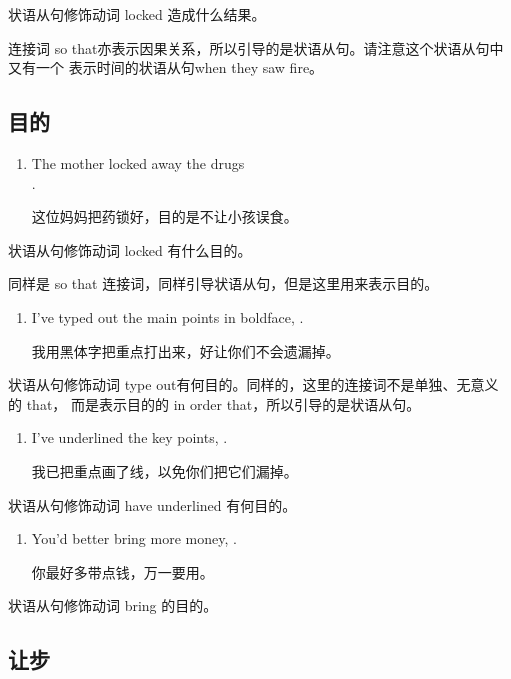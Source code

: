 状语从句修饰动词 locked 造成什么结果。

连接词 so that亦表示因果关系，所以引导的是状语从句。请注意这个状语从句中又有一个
表示时间的状语从句when they saw fire。

\subsection{目的}

\begin{enumerate}
\item The mother locked away the drugs  \\
  .

  这位妈妈把药锁好，目的是不让小孩误食。
\end{enumerate}
状语从句修饰动词 locked 有什么目的。

同样是 so that 连接词，同样引导状语从句，但是这里用来表示目的。

\begin{enumerate}[resume]
\item I've typed out the main points in boldface, 
  .

  我用黑体字把重点打出来，好让你们不会遗漏掉。
\end{enumerate}
状语从句修饰动词 type out有何目的。同样的，这里的连接词不是单独、无意义的 that，
而是表示目的的 in order that，所以引导的是状语从句。

\begin{enumerate}[resume]
\item I've underlined the key points,  .

  我已把重点画了线，以免你们把它们漏掉。
\end{enumerate}
状语从句修饰动词 have underlined 有何目的。

\begin{enumerate}[resume]
\item You'd better bring more money,  .

  你最好多带点钱，万一要用。
\end{enumerate}
状语从句修饰动词 bring 的目的。

\subsection{让步}

